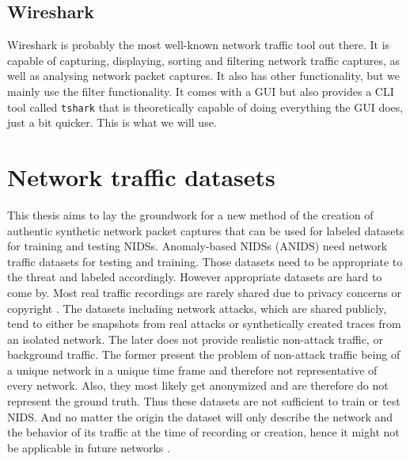 \documentclass[
	ngerman,
	ruledheaders=section,%
	class=report,%
	thesis={type=bachelor},%
	accentcolor=9c,%
	custommargins=true,%
	marginpar=false,%
	parskip=half-,%
	fontsize=11pt,%
]{tudapub}
\let\code\texttt
\begin{document}
\subsection{Wireshark}
\label{sec:wireshark}

Wireshark is probably the most well-known network traffic tool out there.
It is capable of capturing, displaying, sorting and filtering network traffic captures, as well as analysing network packet captures.
It also has other functionality, but we mainly use the filter functionality.
It comes with a GUI but also provides a CLI tool called \code{tshark} that is theoretically capable of doing everything the GUI does, just a bit quicker.
This is what we will use.

\section{Network traffic datasets}
\label{sec:networkTrafficDatasets}

This thesis aims to lay the groundwork for a new method of the creation of authentic synthetic network packet captures
that can be used for labeled datasets for training and testing NIDSs.
Anomaly-based NIDSs (ANIDS) need network traffic datasets for testing and training.
Those datasets need to be appropriate to the threat and labeled accordingly.
However appropriate datasets are hard to come by.
Most real traffic recordings are rarely shared due to privacy concerns \cite{ringFlowbasedNetworkTraffic2019a} or copyright \cite{corderoID2TDIYDataset2015}.
The datasets including network attacks,
which are shared publicly,
tend to either be snapshots from real attacks or synthetically created traces from an isolated network.
The later does not provide realistic non-attack traffic, or background traffic.
The former present the problem of non-attack traffic being of a unique network in a unique time frame and therefore not representative of every network.
Also, they most likely get anonymized and are therefore do not represent the ground truth.
Thus these datasets are not sufficient to train or test NIDS.
And no matter the origin the dataset will only describe the network and the behavior of its traffic at the time of recording or creation, hence it might not be applicable in future networks \cite{ringFlowbasedNetworkTraffic2019a}.


\end{document}
